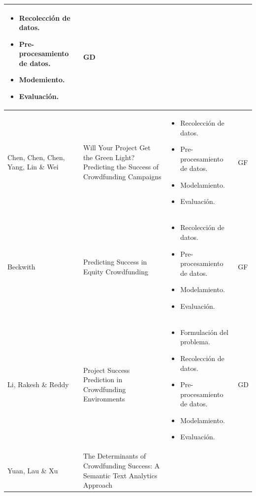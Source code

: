 \begin{longtable}{M{3cm}M{5.5cm}M{5.5cm}M{1.5cm}}
\begin{itemize}[label={--},nosep,noitemsep,leftmargin=*,topsep=0pt,partopsep=0pt]
				\item Recolección de datos.
				\item Pre-procesamiento de datos.
				\item Modemiento.
				\item Evaluación.
			\end{itemize}
			& GD
			\\
			\hline
			Chen, Chen, Chen, Yang, Lin \& Wei
			& Will Your Project Get the Green Light? Predicting the Success of Crowdfunding Campaigns
			& 
			\begin{itemize}[label={--},nosep,noitemsep,leftmargin=*,topsep=0pt,partopsep=0pt]
				\item Recolección de datos.
				\item Pre-procesamiento de datos.
				\item Modelamiento.
				\item Evaluación.
			\end{itemize}
			& GF
			\\
			\hline
			Beckwith
			& Predicting Success in Equity Crowdfunding
			& 
			\begin{itemize}[label={--},nosep,noitemsep,leftmargin=*,topsep=0pt,partopsep=0pt]
				\item Recolección de datos.
				\item Pre-procesamiento de datos.
				\item Modelamiento.
				\item Evaluación.
			\end{itemize}
			&  GF
			\\
			\hline
			Li, Rakesh \& Reddy
			& Project Success Prediction in Crowdfunding Environments
			& 
			\begin{itemize}[label={--},nosep,noitemsep,leftmargin=*,topsep=0pt,partopsep=0pt]
				\item Formulación del problema.
				\item Recolección de datos.
				\item Pre-procesamiento de datos.
				\item Modelamiento.
				\item Evaluación.
			\end{itemize}
			& GD
			\\
			\hline
			Yuan, Lau \& Xu
			& The Determinants of Crowdfunding Success: A Semantic Text Analytics Approach
			& 
			\begin{itemize}[label={--},nosep,noitemsep,leftmargin=*,topsep=0pt,partopsep=0pt]

\end{itemize}
\end{longtable}
